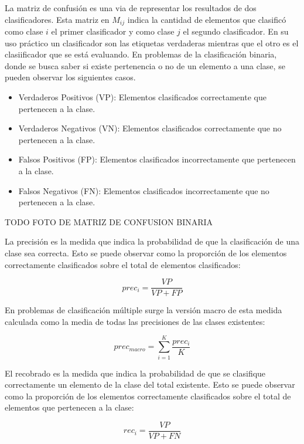 La matriz de confusión es una via de representar los resultados de dos clasificadores. Esta matriz en $M_{ij}$ 
indica la cantidad de elementos que clasificó como clase $i$ el primer clasificador y
como clase $j$ el segundo clasificador. En su uso práctico
un clasificador son las etiquetas verdaderas mientras que el otro es el clasiificador que se está evaluando. 
En problemas de la clasificación binaria, donde se busca saber si existe pertenencia o no de un elemento a una clase,
se pueden observar los siguientes casos.

\begin{itemize}
	\item Verdaderos Positivos (VP): Elementos clasificados correctamente que pertenecen a la clase.
	\item Verdaderos Negativos (VN): Elementos clasificados correctamente que no pertenecen a la clase.
	\item Falsos Positivos (FP): Elementos clasificados incorrectamente que pertenecen a la clase.
	\item Falsos Negativos (FN): Elementos clasificados incorrectamente que no pertenecen a la clase.
\end{itemize}

TODO FOTO DE MATRIZ DE CONFUSION BINARIA

La precisión es la medida que indica la probabilidad de que la clasificación de una clase sea correcta. Esto 
se puede observar como la proporción de los elementos correctamente clasificados sobre el total de 
elementos clasificados:

\begin{equation}
	prec_i = \frac{VP}{VP + FP}
\end{equation}

En problemas de clasificación múltiple surge la versión macro de esta medida calculada como la media de todas
las precisiones de las clases existentes:

\begin{equation}
	prec_{macro} = \sum^K_{i=1} \frac{prec_i}{K}
\end{equation}

El recobrado es la medida que indica la probabilidad de que se clasifique correctamente un elemento de la clase
del total existente. Esto se puede observar como la proporción de los elementos correctamente clasificados sobre el 
total de elementos que pertenecen a la clase:

\begin{equation}
	rec_i = \frac{VP}{VP + FN}
\end{equation}

